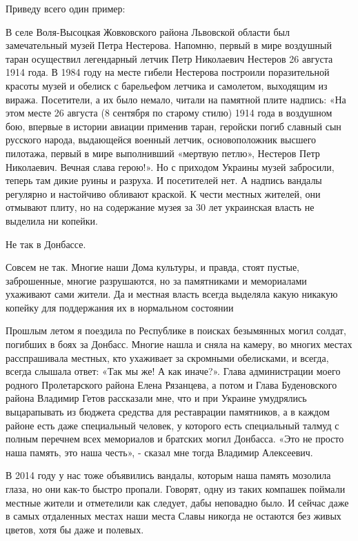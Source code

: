 Приведу всего один пример:

В селе Воля-Высоцкая Жовковского района Львовской области был замечательный
музей Петра Нестерова. Напомню, первый в мире воздушный таран осуществил
легендарный летчик Петр Николаевич Нестеров 26 августа 1914 года. В 1984 году
на месте гибели Нестерова построили поразительной красоты музей и обелиск с
барельефом летчика и самолетом, выходящим из виража. Посетители, а их было
немало, читали на памятной плите надпись: «На этом месте 26 августа (8 сентября
по старому стилю) 1914 года в воздушном бою, впервые в истории авиации применив
таран, геройски погиб славный сын русского народа, выдающейся военный летчик,
основоположник высшего пилотажа, первый в мире выполнивший «мертвую петлю»,
Нестеров Петр Николаевич. Вечная слава герою!». Но с приходом Украины музей
забросили, теперь там дикие руины и разруха. И посетителей нет. А надпись
вандалы регулярно и настойчиво обливают краской. К чести местных жителей, они
отмывают плиту, но на содержание музея за 30 лет украинская власть не выделила
ни копейки.


Не так в Донбассе.

Совсем не так. Многие наши Дома культуры, и правда, стоят пустые, заброшенные, многие разрушаются, но за памятниками и мемориалами ухаживают сами жители. Да и местная власть всегда выделяла какую никакую копейку для поддержания их в нормальном состоянии

Прошлым летом я поездила по Республике в поисках безымянных могил солдат,
погибших в боях за Донбасс. Многие нашла и сняла на камеру, во многих местах
расспрашивала местных, кто ухаживает за скромными обелисками, и всегда, всегда
слышала ответ: «Так мы же! А как иначе?». Глава администрации моего родного
Пролетарского района Елена Рязанцева, а потом и Глава Буденовского района
Владимир Гетов рассказали мне, что и при Украине умудрялись выцарапывать из
бюджета средства для реставрации памятников, а в каждом районе есть даже
специальный человек, у которого есть специальный талмуд с полным перечнем всех
мемориалов и братских могил Донбасса. «Это не просто наша память, это наша
честь», - сказал мне тогда Владимир Алексеевич.

В 2014 году у нас тоже объявились вандалы, которым наша память мозолила глаза,
но они как-то быстро пропали. Говорят, одну из таких компашек поймали местные
жители и отметелили как следует, дабы неповадно было. И сейчас даже в самых
отдаленных местах наши места Славы никогда не остаются без живых цветов, хотя
бы даже и полевых.

